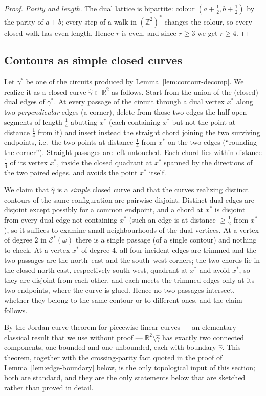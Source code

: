 \documentclass[11pt]{article}
\theoremstyle{plain}
\theoremstyle{definition}
\theoremstyle{remark}
\newcommand{\Z}{\mathbb{Z}}
\newcommand{\R}{\mathbb{R}}
\newcommand{\dualZ}{(\Z^2)^*}       %
\newcommand{\dedges}{\mathscr{E}^*} %
\begin{document}
\begin{proof}
\emph{Parity and length.} The dual lattice is bipartite: colour
$(a+\tfrac12,b+\tfrac12)$ by the parity of $a+b$; every step of a walk in
$\dualZ$ changes the colour, so every closed walk has even length. Hence
$r$ is even, and since $r\ge3$ we get $r\ge4$.
\end{proof}

\subsection{Contours as simple closed curves}

Let $\gamma^*$ be one of the circuits produced by
Lemma~\ref{lem:contour-decomp}. We realize it as a closed curve
$\widehat\gamma\subset\R^2$ as follows. Start from the union of the (closed)
dual edges of $\gamma^*$. At every passage of the circuit through a dual
vertex $x^*$ along two \emph{perpendicular} edges (a corner), delete from
those two edges the half-open segments of length $\tfrac14$ abutting $x^*$
(each containing $x^*$ but not the point at distance $\tfrac14$ from it)
and insert instead the straight chord joining the two surviving endpoints,
i.e.\ the two points at distance $\tfrac14$ from $x^*$ on the two edges
(``rounding the corner''). Straight passages are left untouched. Each chord
lies within distance $\tfrac14$ of its vertex $x^*$, inside the closed
quadrant at $x^*$ spanned by the directions of the two paired edges, and
avoids the point $x^*$ itself.

We claim that $\widehat\gamma$ is a \emph{simple} closed curve and that the
curves realizing distinct contours of the same configuration are pairwise
disjoint. Distinct dual edges are disjoint except possibly for a common
endpoint, and a chord at $x^*$ is disjoint from every dual edge not
containing $x^*$ (such an edge is at distance $\ge\tfrac12$ from $x^*$), so
it suffices to examine small neighbourhoods of the dual vertices. At a
vertex of degree $2$ in $\dedges(\omega)$ there is a single passage (of a
single contour) and nothing to check. At a vertex $x^*$ of degree $4$, all
four incident edges are trimmed and the two passages are the north--east
and the south--west corners; the two chords lie in the closed north-east,
respectively south-west, quadrant at $x^*$ and avoid $x^*$, so they are
disjoint from each other, and each meets the trimmed edges only at its two
endpoints, where the curve is glued. Hence no two passages intersect,
whether they belong to the same contour or to different ones, and the
claim follows.

By the Jordan curve theorem for piecewise-linear curves --- an elementary
classical result that we use without proof ---
$\R^2\setminus\widehat\gamma$ has exactly two connected components, one
bounded and one unbounded, each with boundary $\widehat\gamma$. This
theorem, together with the crossing-parity fact quoted in the proof of
Lemma~\ref{lem:edge-boundary} below, is the only topological input of this
section; both are standard, and they are the only statements below that are
sketched rather than proved in detail.
\end{document}
